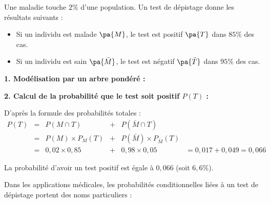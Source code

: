 \begin{methode}
	Une maladie touche $2\%$ d'une population. Un test de dépistage donne les résultats suivants :
	\begin{itemize}
		\item Si un individu est malade $\pa{M}$, le test est positif $\pa{T}$ dans $85\%$ des cas.
		\item Si un individu est sain $\pa{\bar{M}}$, le test est négatif $\pa{\bar{T}}$ dans $95\%$ des cas.
	\end{itemize}

	\textbf{1. Modélisation par un arbre pondéré :}

	\begin{center}
	\end{center}

	\textbf{2. Calcul de la probabilité que le test soit positif $P(T)$ :}

	D'après la formule des probabilités totales :
	\[
		\begin{array}{rccccl}
			P(T) & = & P(M \cap T)        & + & P(\bar{M} \cap T)                &                         \\
			     & = & P(M) \times P_M(T) & + & P(\bar{M}) \times P_{\bar{M}}(T) &                         \\
			     & = & 0,02 \times 0,85   & + & 0,98 \times 0,05                 & = 0,017 + 0,049 = 0,066
		\end{array}
	\]

	La probabilité d'avoir un test positif est égale à $0,066$ (soit $6,6\%$).

	Dans les applications médicales, les probabilités conditionnelles liées à un test de dépistage portent des noms particuliers :


\end{methode}
